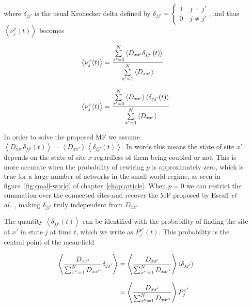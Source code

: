 \noindent where $\delta_{jj'}$ is the usual Kronecker delta defined by $\delta_{jj'}=\begin{cases}1 \quad j=j'\\0 \quad j\neq
j'\end{cases}$, and thus $\left< \nu^x_j(t) \right>$ becomes

\begin{align}
    \left< \nu^x_j(t) \right> &= \frac{\sum\limits_{x'=1}^N\left< D_{xx'}\delta_{jj'}(t)\right>}{\sum\limits_{x'=1}^N\left< D_{xx'} \right>}
    \notag \\[8pt]
    \left< \nu^x_j(t) \right> &= \frac{\sum\limits_{x'=1}^N\left< D_{xx'}\right>\left<\delta_{jj'}(t)\right>}{\sum\limits_{x'=1}^N\left< D_{xx'} \right>}
\end{align}

\noindent In order to solve the proposed MF we assume $\left< D_{xx'}\delta_{jj'}(t)\right> = \left<
D_{xx'}\right>\left<\delta_{jj'}(t)\right>$. In words this means the state of site $x'$ depends on the state of site $x$ regardless of
them being coupled or not. This is more accurate when the probability of rewiring $p$ is approximately zero, which is true for a large
number of networks in the small-world regime, as seen in figure~\ref{fig:small-world} of chapter~\ref{chap:article}. When $p=0$ we can
restrict the summation over the connected sites and recover the MF proposed by Escaff \textit{et al.}~\cite{escaff2014arrays}, making
$\delta_{jj'}$ truly independent from $D_{xx'}$.

The quantity $\left< \delta_{jj'}(t) \right>$ can be identified with the probability of finding the site at $x'$ in state $j$ at time
$t$, which we write as $P^{x'}_j(t)$. This probability is the central point of the mean-field

\begin{align}
    \left< \frac{D_{xx'}}{\sum_{x''=1}^ND_{xx''}}\delta_{jj'} \right> &= \left< \frac{D_{xx'}}{\sum_{x''=1}^ND_{xx''}} \right>\left< \delta_{jj'} \right> \notag\\[8pt]
    &= \left< \frac{D_{xx'}}{\sum_{x''=1}^ND_{xx''}} \right> P^{x'}_j
\end{align}
